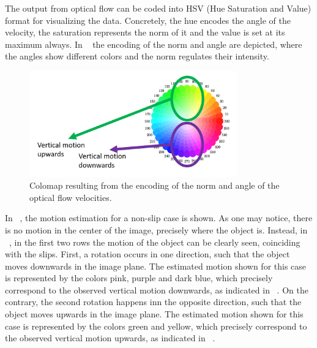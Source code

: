 The output from optical flow can be coded into HSV (Hue Saturation and Value) format for visualizing the data. Concretely, the hue encodes the angle of the velocity, the saturation represents the norm of it and the value is set at its maximum always. In ~ the encoding of the norm and angle are depicted, where the angles show different colors and the norm regulates their intensity.\\

\begin{figure}[h]
    \centering
    \includegraphics[width=0.8\textwidth]{resources/images/OF_angle}
    \caption{Colomap resulting from the encoding of the norm and angle of the optical flow velocities.}\label{fig:OF_angle}
\end{figure}

In ~, the motion estimation for a non-slip case is shown. As one may notice, there is no motion in the center of the image, precisely where the object is. Instead, in ~, in the first two rows the motion of the object can be clearly seen, coinciding with the slips. First, a rotation occurs in one direction, such that the object moves downwards in the image plane. The estimated motion shown for this case is represented by the colors pink, purple and dark blue, which precisely correspond to the observed vertical motion downwards, as indicated in ~. On the contrary, the second rotation happens inn the opposite direction, such that the object moves upwards in the image plane. The estimated motion shown for this case is represented by the colors green and yellow, which precisely correspond to the observed vertical motion upwards, as indicated in ~.

